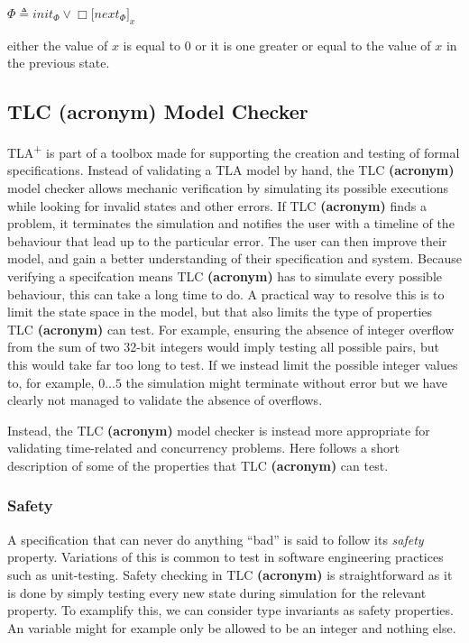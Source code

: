 \documentclass[english, biblatex, digitaloutput]{kththesis}
\begin{document}
\begin{math}
	\Phi \triangleq init_\Phi \lor \Box \lbrack next_\Phi \rbrack_x
\end{math}

\ie either the value of $x$ is equal to 0 or it is one greater or equal to the value of $x$ in the previous state.

\subsection{TLC \textbf{(acronym)} Model Checker}

TLA\textsuperscript+ is part of a toolbox made for supporting the creation and testing of formal specifications. Instead of validating a TLA model by hand, the TLC \textbf{(acronym)} model checker allows mechanic verification by simulating its possible executions while looking for invalid states and other errors. If TLC \textbf{(acronym)} finds a problem, it terminates the simulation and notifies the user with a timeline of the behaviour that lead up to the particular error. The user can then improve their model, and gain a better understanding of their specification and system. Because verifying a specifcation means TLC \textbf{(acronym)} has to simulate every possible behaviour, this can take a long time to do. A practical way to resolve this is to limit the state space in the model, but that also limits the type of properties TLC \textbf{(acronym)} can test. For example, ensuring the absence of integer overflow from the sum of two 32-bit integers would imply testing all possible pairs, but this would take far too long to test. If we instead limit the possible integer values to, for example, $0 \dotsc 5$ the simulation might terminate without error but we have clearly not managed to validate the absence of overflows.

Instead, the TLC \textbf{(acronym)} model checker is instead more appropriate for validating time-related and concurrency problems. Here follows a short description of some of the properties that TLC \textbf{(acronym)} can test.

\subsubsection{Safety}

A specification that can never do anything ``bad'' is said to follow its \textit{safety} property. Variations of this is common to test in software engineering practices such as unit-testing. Safety checking in TLC \textbf{(acronym)} is straightforward as it is done by simply testing every new state during simulation for the relevant property. To examplify this, we can consider type invariants as safety properties. An variable might for example only be allowed to be an integer and nothing else.
\end{document}
